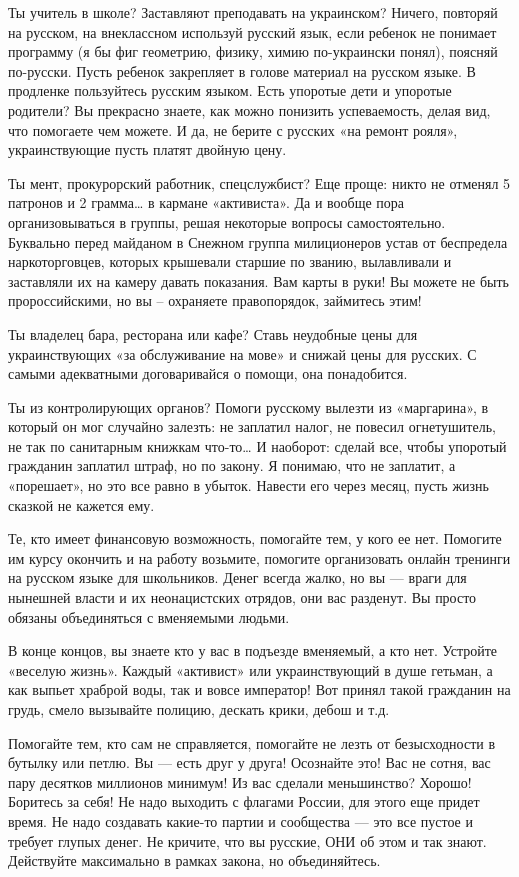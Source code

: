 \documentclass[a4paper,11pt]{extreport}
\begin{document}
Ты учитель в школе? Заставляют преподавать на украинском? Ничего, повторяй на
русском, на внеклассном используй русский язык, если ребенок не понимает
программу (я бы фиг геометрию, физику, химию по-украински понял), поясняй
по-русски. Пусть ребенок закрепляет в голове материал на русском языке. В
продленке пользуйтесь русским языком. Есть упоротые дети и упоротые родители?
Вы прекрасно знаете, как можно понизить успеваемость, делая вид, что помогаете
чем можете. И да, не берите с русских «на ремонт рояля», украинствующие пусть
платят двойную цену.

Ты мент, прокурорский работник, спецслужбист? Еще проще: никто не отменял 5
патронов и 2 грамма… в кармане «активиста». Да и вообще пора организовываться в
группы, решая некоторые вопросы самостоятельно. Буквально перед майданом в
Снежном группа милиционеров устав от беспредела наркоторговцев, которых
крышевали старшие по званию, вылавливали и заставляли их на камеру давать
показания. Вам карты в руки! Вы можете не быть пророссийскими, но вы –
охраняете правопорядок, займитесь этим!

Ты владелец бара, ресторана или кафе? Ставь неудобные цены для украинствующих
«за обслуживание на мове» и снижай цены для русских. С самыми адекватными
договаривайся о помощи, она понадобится.

Ты из контролирующих органов? Помоги русскому вылезти из «маргарина», в который
он мог случайно залезть: не заплатил налог, не повесил огнетушитель, не так по
санитарным книжкам что-то… И наоборот: сделай все, чтобы упоротый гражданин
заплатил штраф, но по закону. Я понимаю, что не заплатит, а «порешает», но это
все равно в убыток. Навести его через месяц, пусть жизнь сказкой не кажется
ему.

Те, кто имеет финансовую возможность, помогайте тем, у кого ее нет. Помогите им
курсу окончить и на работу возьмите, помогите организовать онлайн тренинги на
русском языке для школьников. Денег всегда жалко, но вы --- враги для нынешней
власти и их неонацистских отрядов, они вас разденут. Вы просто обязаны
объединяться с вменяемыми людьми.

В конце концов, вы знаете кто у вас в подъезде вменяемый, а кто нет. Устройте
«веселую жизнь». Каждый «активист» или украинствующий в душе гетьман, а как
выпьет храброй воды, так и вовсе император! Вот принял такой гражданин на
грудь, смело вызывайте полицию, дескать крики, дебош и т.д.

Помогайте тем, кто сам не справляется, помогайте не лезть от безысходности в
бутылку или петлю. Вы --- есть друг у друга! Осознайте это! Вас не сотня, вас
пару десятков миллионов минимум! Из вас сделали меньшинство? Хорошо! Боритесь
за себя! Не надо выходить с флагами России, для этого еще придет время. Не надо
создавать какие-то партии и сообщества --- это все пустое и требует глупых денег.
Не кричите, что вы русские, ОНИ об этом и так знают. Действуйте максимально в
рамках закона, но объединяйтесь.
\end{document}
